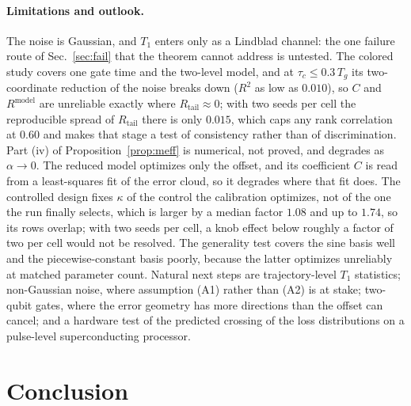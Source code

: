\documentclass[aps,pra,twocolumn,superscriptaddress,reprint,nofootinbib,floatfix]{revtex4-2}
\theoremstyle{definition}
\newcommand{\Rt}{R_{\mathrm{tail}}}
\newcommand{\Rm}{R^{\mathrm{model}}}
\begin{document}
\paragraph*{Limitations and outlook.} The noise is Gaussian, and $T_1$
enters only as a Lindblad channel: the one failure route of
Sec.~\ref{sec:fail} that the theorem cannot address is untested. The colored
study covers one gate time and the two-level model, and at
$\tau_c\le0.3\,T_g$ its two-coordinate reduction of the noise breaks down
($R^2$ as low as $0.010$), so $C$ and $\Rm$ are unreliable exactly where
$\Rt\approx0$; with two seeds per cell the reproducible spread of $\Rt$ there
is only $0.015$, which caps any rank correlation at $0.60$ and makes that
stage a test of consistency rather than of discrimination. Part (iv) of
Proposition~\ref{prop:meff} is numerical, not proved, and degrades as
$\alpha\to0$. The
reduced model optimizes only the offset, and its coefficient $C$ is read from
a least-squares fit of the error cloud, so it degrades where that fit does.
The controlled design fixes $\kappa$ of the control the calibration optimizes,
not of the one the run finally selects, which is larger by a median factor
$1.08$ and up to $1.74$, so its rows overlap; with two seeds per cell, a knob
effect below roughly a factor of two per cell would not be resolved. The
generality test covers the sine basis well and the piecewise-constant basis
poorly, because the latter optimizes unreliably at matched parameter count.
Natural next steps are trajectory-level $T_1$ statistics; non-Gaussian
noise, where assumption (A1) rather than (A2) is at stake; two-qubit gates, where the error geometry has more directions than the
offset can cancel; and a hardware test of the predicted crossing of the loss
distributions on a pulse-level superconducting processor.

\section{Conclusion}
\label{sec:conclusion}
\end{document}

